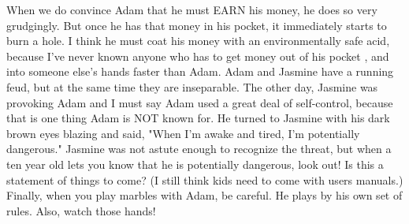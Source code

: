 When we do convince Adam that he must EARN his money, he does so very grudgingly. But once he has that money in his pocket, it immediately
starts to burn a hole. I think he must coat his money with an environmentally safe acid, because I've never known anyone who has to get money
out of his pocket , and into someone else's hands faster than Adam. Adam and Jasmine have a running feud, but at the same time they are
inseparable. The other day, Jasmine was provoking Adam and I must say Adam used a great deal of self-control, because that is one thing Adam is
NOT known for. He turned to Jasmine with his dark brown eyes blazing and said, "When I'm awake and tired, I'm potentially dangerous." Jasmine
was not astute enough to recognize the threat, but when a ten year old lets you know that he is potentially dangerous, look out! Is this a
statement of things to come? (I still think kids need to come with users manuals.) Finally, when you play marbles with Adam, be careful. He
plays by his own set of rules. Also, watch those hands!

